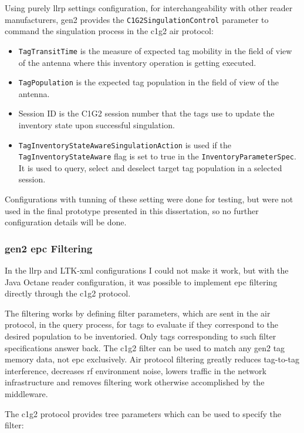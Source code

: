 Using purely \ac{llrp} settings configuration, for  interchangeability with other reader manufacturers, \ac{gen2} provides the \texttt{C1G2SingulationControl} parameter to command the singulation process in the \ac{c1g2} air protocol:

\begin{itemize}
    \item \texttt{TagTransitTime} is the measure of expected tag mobility in the field of view of the antenna where this inventory operation is getting executed.
    \item \texttt{TagPopulation} is the expected tag population in the field of view of the antenna.
    \item Session ID is the C1G2 session number that the tags use to update the inventory state upon successful singulation.
    \item \texttt{TagInventoryStateAwareSingulationAction} is used if the \texttt{TagInventoryStateAware} flag is set to true in the \texttt{InventoryParameterSpec}. It is used to query, select and deselect target tag population in a selected session.
\end{itemize}

Configurations with tunning of these setting were done for testing, but were not used in the final prototype presented in this dissertation, so no further configuration details will be done.

\subsubsection{\ac{gen2} \ac{epc} Filtering}

In the \ac{llrp} and LTK-\ac{xml} configurations I could not make it work, but with the Java Octane reader configuration, it was possible to implement \ac{epc} filtering directly through the \ac{c1g2} protocol.

The filtering works by defining filter parameters, which are sent in the air protocol, in the query process, for tags to evaluate if they correspond to the desired population to be inventoried. Only tags corresponding to such filter specifications answer back.
The \ac{c1g2} filter can be used to match any \ac{gen2} tag memory data, not \ac{epc} exclusively.
Air protocol filtering greatly reduces tag-to-tag interference, decreases \ac{rf} environment noise, lowers traffic in the network infrastructure and removes filtering work otherwise accomplished by the middleware.

The \ac{c1g2} protocol provides tree parameters which can be used to specify the filter: 

